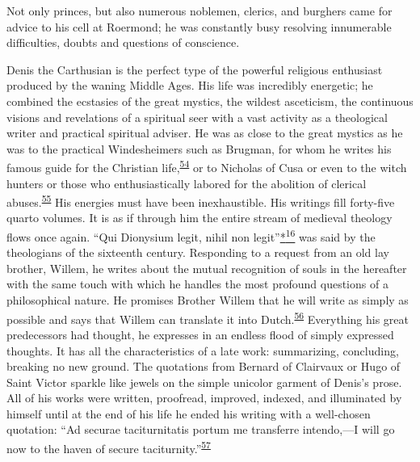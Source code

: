 Not only princes, but also numerous noblemen, clerics, and burghers came
for advice to his cell at Roermond; he was constantly busy resolving
innumerable difficulties, doubts and questions of conscience.

Denis the Carthusian is the perfect type of the powerful religious
enthusiast produced by the waning Middle Ages. His life was incredibly
energetic; he combined the ecstasies of the great mystics, the wildest
asceticism, the continuous visions and revelations of a spiritual seer
with a vast activity as a theological writer and practical spiritual
adviser. He was as close to the great mystics as he was to the practical
Windesheimers such as Brugman, for whom he writes his famous guide for
the Christian
life,\textsuperscript{\protect\hypertarget{14_Chapter_Seven__THE_PIOUS_PERSONA.xhtmlux5cux23id_917}{\protect\hyperlink{23_NOTES.xhtmlux5cux23id_918}{54}}}
or to Nicholas of Cusa or even to the witch hunters or those who
enthusiastically labored for the abolition of clerical
abuses.\textsuperscript{\protect\hypertarget{14_Chapter_Seven__THE_PIOUS_PERSONA.xhtmlux5cux23id_915}{\protect\hyperlink{23_NOTES.xhtmlux5cux23id_916}{55}}}
His energies must have been inexhaustible. His writings fill forty-five
quarto volumes. It is as if through him the entire stream of medieval
theology flows once again. ``Qui Dionysium legit, nihil non
legit''\protect\hypertarget{14_Chapter_Seven__THE_PIOUS_PERSONA.xhtmlux5cux23id_2327}{\protect\hyperlink{23_NOTES.xhtmlux5cux23id_2328}{*\textsuperscript{16}}}
was said by the theologians of the sixteenth century. Responding to a
request from an old lay brother, Willem, he writes about the mutual
recognition of souls in the hereafter with the same touch with which he
handles the most profound questions of a philosophical nature. He
promises Brother Willem that he will write as simply as possible and
says that Willem can translate it into
Dutch.\textsuperscript{\protect\hypertarget{14_Chapter_Seven__THE_PIOUS_PERSONA.xhtmlux5cux23id_913}{\protect\hyperlink{23_NOTES.xhtmlux5cux23id_914}{56}}}
Everything his great predecessors had thought, he expresses in an
endless flood of simply expressed thoughts. It has all the
characteristics of a late work: summarizing, concluding, breaking no new
ground. The quotations from Bernard of Clairvaux or Hugo of Saint Victor
sparkle like jewels on the simple unicolor garment of Denis's prose. All
of his works were written, proofread, improved, indexed, and illuminated
by himself until at the end of his life he ended his writing with a
well-chosen quotation: ``Ad securae taciturnitatis portum me transferre
intendo,---I will go now to the haven of secure
taciturnity.''\textsuperscript{\protect\hypertarget{14_Chapter_Seven__THE_PIOUS_PERSONA.xhtmlux5cux23id_911}{\protect\hyperlink{23_NOTES.xhtmlux5cux23id_912}{57}}}

